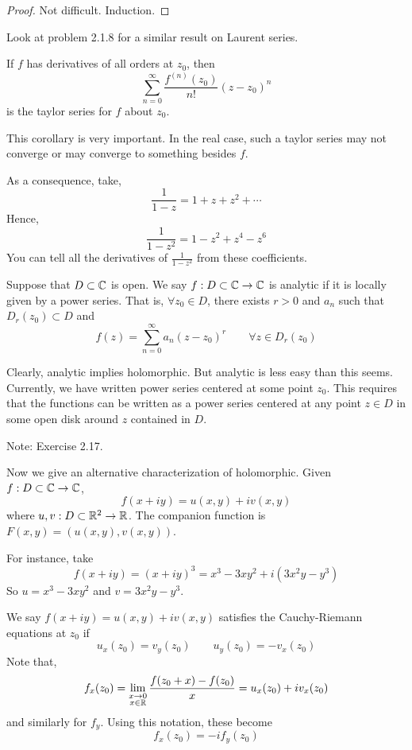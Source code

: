 \documentclass[12pt]{amsart}
\begin{document}
\begin{proof}
    Not difficult. Induction. 
\end{proof}

Look at problem 2.1.8 for a similar result on Laurent series. 

\begin{definition}
    If $f$ has derivatives of all orders at $z_0$, then 
    \[ \sum_{n=0}^\infty \frac{f^{(n)}(z_0)}{n!}(z-z_0)^n\]
    is the taylor series for $f$ about $z_0$. 
\end{definition}

This corollary is very important. In the real case, such a taylor series may not converge or may converge to something besides $f$. 

As a consequence, take, 
\[ \frac{1}{1-z} = 1+z+z^2 + \cdots \]
Hence, 
\[ \frac{1}{1-z^2} = 1-z^2 + z^4 - z^6\]
You can tell all the derivatives of $\frac{1}{1-z^2}$ from these coefficients. 

\begin{definition}
    Suppose that $D \subset \mathbb C$ is open. We say $f: D \subset \mathbb C \to \mathbb C$ is analytic if it is locally given by a power series. That is, $\forall z_0 \in D$, there exists $r > 0$ and $a_n$ such that $D_r(z_0) \subset D$ and 
    \[ f(z) = \sum_{n=0}^\infty a_n(z-z_0)^r \qquad \forall z \in D_r(z_0)\]
\end{definition}

\begin{remark}
    Clearly, analytic implies holomorphic. But analytic is less easy than this seems. Currently, we have written power series centered at some point $z_0$. This requires that the functions can be written as a power series centered at any point $z \in D$ in some open disk around $z$ contained in $D$. 
\end{remark}

Note: Exercise 2.17. 

Now we give an alternative characterization of holomorphic. Given $f: D \subset \mathbb C \to \mathbb C$, 
\[ f(x+iy) = u(x,y) + iv(x,y)\]
where $u,v: D \subset \mathbb R^2 \to \mathbb R$. The companion function is $F(x,y) = (u(x,y), v(x,y))$. 

\begin{example}
    For instance, take
    \[ f(x+iy) = (x+iy)^3 = x^3 -3xy^2 + i(3x^2y-y^3)\]
    So $u = x^3 -3xy^2$ and $v = 3x^2y-y^3$. 
\end{example}


\begin{definition}
    We say $f(x+iy) = u(x,y) + iv(x,y)$ satisfies the Cauchy-Riemann equations at $z_0$ if 
    \[ u_x(z_0) = v_y(z_0) \qquad u_y(z_0) = -v_x(z_0)\]
    Note that, 
    \[ f_x(z_0) = \lim_{\substack{x\to 0 \\ x \in \mathbb R}} \frac{f(z_0+x)-f(z_0)}{x} = u_x(z_0) +iv_x(z_0)\]
    and similarly for $f_y$. Using this notation, these become
    \[ f_x(z_0) = - if_y(z_0) \]

\end{definition}
\end{document}
